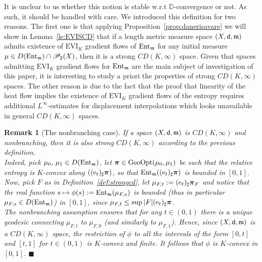 \documentclass[reqno,11pt]{article}
\numberwithin{equation}{section}
\newcommand{\D}{\mathbb{D}}
\newcommand{\mm}{{\mbox{\boldmath$m$}}}
\newcommand{\ppi}{{\mbox{\boldmath$\pi$}}}
\newcommand{\sfd}{{\sf d}}
\newcommand{\EVI}[4]{\mathrm{EVI}_{#4}(#1,{#2}_W,#3)}
\newcommand{\ProbabilitiesTwo}[1]{\mathscr P_2(#1)}     %
\newtheorem{remark}[theorem]{Remark}
\newcommand{\entv}{{\rm Ent}_{\mm}}                    %
\newcommand{\probt}{\ProbabilitiesTwo}
\newcommand{\e}{{\rm{e}}}                           %
\newcommand{\gopt}{{\rm{GeoOpt}}}                   %
\newcommand{\fr}{\hfill$\blacksquare$}                      %
\newcommand{\entr}[2]{{\rm Ent}_{#2}(#1)}              %
\newcommand{\muF}[1]{\mu_{F,#1}}
\renewcommand{\EVI}{\ensuremath{\mathrm{EVI}}}
\renewcommand{\mm}{\mathfrak m}
\begin{document}
It is unclear to us whether this notion is stable w.r.t
$\D$-convergence or not. As such, it should be handled with care. We
introduced this definition for two reasons. The first one is that
applying Proposition~\ref{prop:danerisavare} we will show in
Lemma~\ref{le:EVISCD} that if a length metric measure space
$(X,\sfd,\mm)$ admits existence of $\EVI_K$ gradient flows of
$\entv$ for any initial measure $\mu\in D(\entv)\cap\probt X$, then
it is a strong $CD(K,\infty)$ space. Given that spaces admitting
$\EVI_K$ gradient flows for $\entv$ are the main subject of
investigation of this paper, it is interesting to study a priori the
properties of strong $CD(K,\infty)$ spaces. The other reason is due
to the fact that the proof that linearity of the heat flow implies
the existence of $\EVI_K$ gradient flows of the entropy requires
additional $L^\infty$-estimates for displacement interpolations
which looks unavailable in general $CD(K,\infty)$ spaces.

\begin{remark}[The nonbranching case]\label{re:nonbr}{\rm If a space $(X,\sfd,\mm)$
is $CD(K,\infty)$ and nonbranching, then it is also strong
$CD(K,\infty)$ according to the previous definition. \\
Indeed, pick $\mu_0,\,\mu_1\in D(\entv)$, let
$\ppi\in\gopt(\mu_0,\mu_1)$ be such that the relative entropy is
$K$-convex along $((\e_t)_\sharp\ppi)$, so that
$\entr{(\e_t)_\sharp\ppi}{\mm}$ is bounded in $[0,1]$. Now, pick $F$
as in Definition~\ref{def:strongcd}, let $\muF
t:=(\e_t)_\sharp\ppi_F$ and notice that the real function $s\mapsto
\phi(s):=\entr{\muF s}{\mm}$ is bounded (thus in particular $\muF
s\in D(\entv)$) in $[0,1]$, since $\muF t\leq\sup|F|
(\e_t)_\sharp\ppi$.\\
The nonbranching assumption ensures that for any $t\in(0,1)$ there
is a unique geodesic connecting $\muF t$ to $\muF 0$ (and similarly
to $\muF 1$). Hence, since $(X,\sfd,\mm)$ is a $CD(K,\infty)$ space,
the restriction of $\phi$ to all the intervals of the form $[0,t]$
and $[t,1]$ for $t\in(0,1)$ is $K$-convex and finite. It follows
that $\phi$ is $K$-convex in $[0,1]$. \fr }\end{remark}
\end{document}

